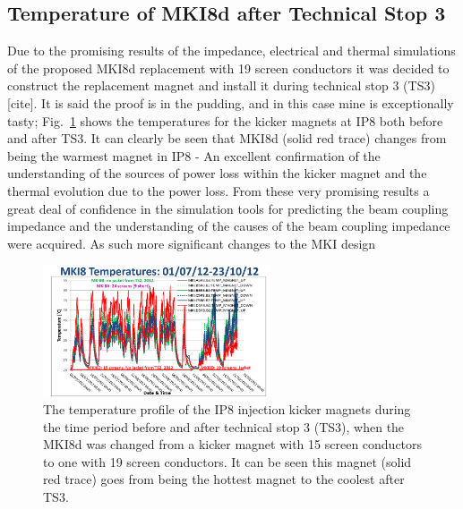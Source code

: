 \subsection{Temperature of MKI8d after Technical Stop 3}

Due to the promising results of the impedance, electrical and thermal simulations of the proposed MKI8d replacement with 19 screen conductors it was decided to construct the replacement magnet and install it during technical stop 3 (TS3)[cite]. It is said the proof is in the pudding, and in this case mine is exceptionally tasty; Fig.~\ref{fig:heating-mki8-post-ts3} shows the temperatures for the kicker magnets at IP8 both before and after TS3. It can clearly be seen that MKI8d (solid red trace) changes from being the warmest magnet in IP8 - An excellent confirmation of the understanding of the sources of power loss within the kicker magnet and the thermal evolution due to the power loss. From these very promising results a great deal of confidence in the simulation tools for predicting the beam coupling impedance and the understanding of the causes of the beam coupling impedance were acquired. As such more significant changes to the MKI design

\begin{figure}
\begin{center}
\includegraphics[width=0.6\textwidth]{LHC_MKI/figures/mki8-temps-post-ts3.png}
\end{center}
\label{fig:heating-mki8-post-ts3}
\caption{The temperature profile of the IP8 injection kicker magnets during the time period before and after technical stop 3  (TS3), when the MKI8d was changed from a kicker magnet with 15 screen conductors to one with 19 screen conductors. It can be seen this magnet (solid red trace) goes from being the hottest magnet to the coolest after TS3.}
\end{figure}